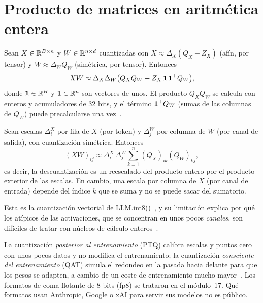 \section{Producto de matrices en aritmética entera}

\begin{proposicion}\label{prop:producto-entero}
Sean $X\in\mathbb{R}^{B\times n}$ y $W\in\mathbb{R}^{n\times d}$ cuantizadas con $X\approx\Delta_X(Q_X-Z_X)$ (afín, por tensor) y $W\approx\Delta_WQ_W$ (simétrica, por tensor). Entonces
\[
XW\approx\Delta_X\Delta_W\bigl(Q_XQ_W-Z_X\,\mathbf{1}\,\mathbf{1}^{\top} Q_W\bigr),
\]
donde $\mathbf{1}\in\mathbb{R}^{B}$ y $\mathbf{1}\in\mathbb{R}^{n}$ son vectores de unos. El producto $Q_XQ_W$ se calcula con enteros y acumuladores de 32 bits, y el término $\mathbf{1}^{\top} Q_W$ (sumas de las columnas de $Q_W$) puede precalcularse una vez~\cite[§2]{jacob}.
\end{proposicion}

\begin{proposicion}\label{prop:factorizar}
Sean escalas $\Delta^{X}_{i}$ por fila de $X$ (por token) y $\Delta^{W}_{j}$ por columna de $W$ (por canal de salida), con cuantización simétrica. Entonces
\[
(XW)_{ij}\approx\Delta^{X}_{i}\,\Delta^{W}_{j}\sum_{k=1}^{n}(Q_X)_{ik}(Q_W)_{kj},
\]
es decir, la descuantización es un reescalado del producto entero por el producto exterior de las escalas. En cambio, una escala por columna de $X$ (por canal de entrada) depende del índice $k$ que se suma y no se puede sacar del sumatorio.
\end{proposicion}

Esta es la cuantización vectorial de LLM.int8()~\cite[§3.1]{llmint8}, y su limitación explica por qué los atípicos de las activaciones, que se concentran en unos pocos \emph{canales}, son difíciles de tratar con núcleos de cálculo enteros~\cite[§3]{smoothquant}.

\begin{observacion}
La cuantización \emph{posterior al entrenamiento} (PTQ) calibra escalas y puntos cero con unos pocos datos y no modifica el entrenamiento; la cuantización \emph{consciente del entrenamiento} (QAT) simula el redondeo en la pasada hacia delante para que los pesos se adapten, a cambio de un coste de entrenamiento mucho mayor~\cite{cs336,mit65940}. Los formatos de coma flotante de 8 bits (fp8) se trataron en el módulo~17. Qué formatos usan Anthropic, Google o xAI para servir sus modelos no es público.
\end{observacion}

